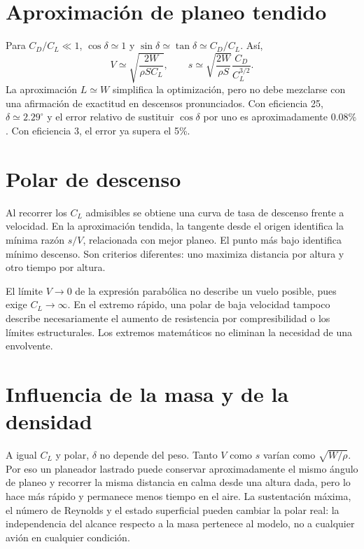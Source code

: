 \section{Aproximación de planeo tendido}
Para $C_D/C_L\ll1$, $\cos\delta\simeq1$ y $\sin\delta\simeq\tan\delta\simeq C_D/C_L$. Así,
\begin{equation}
V\simeq\sqrt{\frac{2W}{\rho SC_L}},\qquad
s\simeq\sqrt{\frac{2W}{\rho S}}\frac{C_D}{C_L^{3/2}}.
\label{eq:descenso-aprox}
\end{equation}
La aproximación $L\simeq W$ simplifica la optimización, pero no debe mezclarse con una afirmación de exactitud en descensos pronunciados. Con eficiencia 25, $\delta\simeq2.29^\circ$ y el error relativo de sustituir $\cos\delta$ por uno es aproximadamente $0.08\%$. Con eficiencia 3, el error ya supera el 5\%.

\section{Polar de descenso}
Al recorrer los $C_L$ admisibles se obtiene una curva de tasa de descenso frente a velocidad. En la aproximación tendida, la tangente desde el origen identifica la mínima razón $s/V$, relacionada con mejor planeo. El punto más bajo identifica mínimo descenso. Son criterios diferentes: uno maximiza distancia por altura y otro tiempo por altura.


El límite $V\to0$ de la expresión parabólica no describe un vuelo posible, pues exige $C_L\to\infty$. En el extremo rápido, una polar de baja velocidad tampoco describe necesariamente el aumento de resistencia por compresibilidad o los límites estructurales. Los extremos matemáticos no eliminan la necesidad de una envolvente.

\section{Influencia de la masa y de la densidad}
A igual $C_L$ y polar, $\delta$ no depende del peso. Tanto $V$ como $s$ varían como $\sqrt{W/\rho}$. Por eso un planeador lastrado puede conservar aproximadamente el mismo ángulo de planeo y recorrer la misma distancia en calma desde una altura dada, pero lo hace más rápido y permanece menos tiempo en el aire. La sustentación máxima, el número de Reynolds y el estado superficial pueden cambiar la polar real: la independencia del alcance respecto a la masa pertenece al modelo, no a cualquier avión en cualquier condición.

